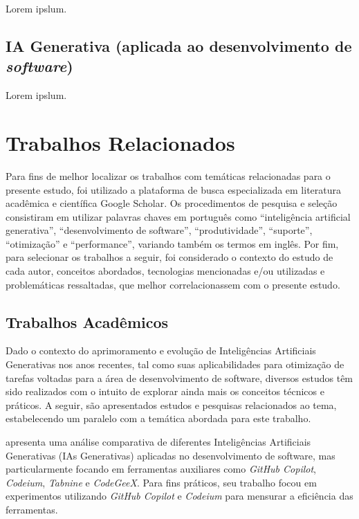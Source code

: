 \documentclass[english,brazilian]{UNISINOSartigo} %
\begin{document}
Lorem ipslum.

\subsection{IA Generativa (aplicada ao desenvolvimento de \textit{software})}

Lorem ipslum.

\section{Trabalhos Relacionados}

Para fins de melhor localizar os trabalhos com temáticas relacionadas para o presente estudo, foi utilizado a plataforma de busca especializada em literatura acadêmica e científica Google Scholar. Os procedimentos de pesquisa e seleção consistiram em utilizar palavras chaves em português como “inteligência artificial generativa”, “desenvolvimento de software”, “produtividade”, “suporte”, “otimização” e “performance”, variando também os termos em inglês. Por fim, para selecionar os trabalhos a seguir, foi considerado o contexto do estudo de cada autor, conceitos abordados, tecnologias mencionadas e/ou utilizadas e problemáticas ressaltadas, que melhor correlacionassem com o presente estudo.

\subsection{Trabalhos Acadêmicos}

Dado o contexto do aprimoramento e evolução de Inteligências Artificiais Generativas nos anos recentes, tal como suas aplicabilidades para otimização de tarefas voltadas para a área de desenvolvimento de software, diversos estudos têm sido realizados com o intuito de explorar ainda mais os conceitos técnicos e práticos. A seguir, são apresentados estudos e pesquisas relacionados ao tema, estabelecendo um paralelo com a temática abordada para este trabalho.

 apresenta uma análise comparativa de diferentes Inteligências Artificiais Generativas (IAs Generativas) aplicadas no desenvolvimento de software, mas particularmente focando em ferramentas auxiliares como \textit{GitHub Copilot}, \textit{Codeium}, \textit{Tabnine} e \textit{CodeGeeX}. Para fins práticos, seu trabalho focou em experimentos utilizando \textit{GitHub Copilot} e \textit{Codeium} para mensurar a eficiência das ferramentas.
\end{document}
